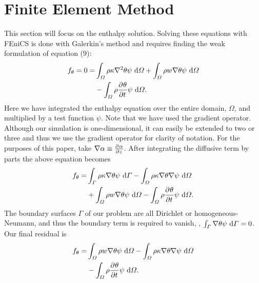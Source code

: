 \section{Finite Element Method}

This section will focus on the enthalpy solution.  Solving these equations with FEniCS is done with Galerkin's method and requires finding the weak formulation of equation (9):
\begin{align*}
  f_{\theta} = 0 =
  &\int_{\varOmega} 
    \rho \kappa \nabla^2 \theta \psi \ \mathrm{d}\varOmega 
  + \int_{\varOmega} \rho w \nabla \theta \psi \ \mathrm{d}\varOmega \\
  &- \int_{\varOmega} {\rho \frac{\partial^{} \theta}{\partial t^{} }} \psi \ \mathrm{d}\varOmega.
\end{align*}
Here we have integrated the enthalpy equation over the entire domain, $\Omega$, and multiplied by a test function $\psi$.  Note that we have used the gradient operator.  Although our simulation is one-dimensional, it can easily be extended to two or three and thus we use the gradient operator for clarity of notation.  For the purposes of this paper, take $\nabla{\alpha} \equiv \frac{\partial^{} \alpha}{\partial z^{} }$.  After integrating the diffusive term by parts the above equation becomes
\begin{align*}
  f_{\theta} =
  & \int_{\varGamma} 
      \rho \kappa \nabla \theta \psi \ \mathrm{d}\varGamma
  - \int_{\varOmega} 
      \rho \kappa \nabla \theta \nabla \psi \ \mathrm{d}\varOmega \\ 
  &+ \int_{\varOmega} \rho w \nabla \theta \psi \ \mathrm{d}\varOmega
  - \int_{\varOmega} {\rho \frac{\partial^{} \theta}{\partial t^{} }} \psi \ \mathrm{d}\varOmega.
\end{align*}
The boundary surfaces $\Gamma$ of our problem are all Dirichlet or homogeneous-Neumann, and thus the boundary term is required to vanish, \ie, $\int_{\varGamma} \nabla \theta \psi \ \mathrm{d}\varGamma = 0$.  Our final residual is
\begin{align}
    f_{\theta} =
    &\int_{\varOmega} \rho w \nabla \theta \psi \ \mathrm{d}\varOmega
    - \int_{\varOmega} 
        \rho \kappa \nabla \theta \nabla \psi \ \mathrm{d}\varOmega \notag \\ 
    &- \int_{\varOmega} {\rho \frac{\partial^{} \theta}{\partial t^{} }} \psi \ \mathrm{d}\varOmega.
\end{align}

